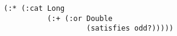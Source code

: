 \begin{lstlisting}[style=reclojureClojure]
(:* (:cat Long 
          (:+ (:or Double
                   (satisfies odd?)))))
\end{lstlisting}
